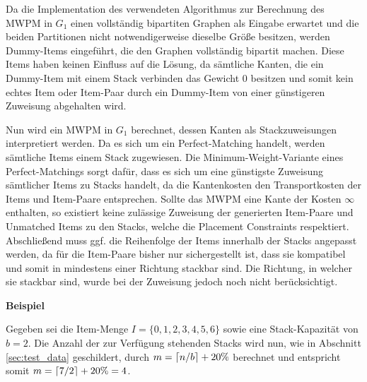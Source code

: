 Da die Implementation des verwendeten Algorithmus zur Berechnung des \textsc{MWPM} in $G_1$ einen vollständig bipartiten Graphen als Eingabe
erwartet und die beiden Partitionen nicht notwendigerweise dieselbe Größe besitzen, werden Dummy-Items eingeführt, die den Graphen
vollständig bipartit machen. Diese Items haben keinen Einfluss auf die Lösung, da sämtliche Kanten, die ein Dummy-Item mit einem Stack
verbinden das Gewicht $0$ besitzen und somit kein echtes Item oder Item-Paar durch ein Dummy-Item von einer günstigeren Zuweisung
abgehalten wird.

Nun wird ein \textsc{MWPM} in $G_1$ berechnet, dessen Kanten als Stackzuweisungen interpretiert werden.
Da es sich um ein Perfect-Matching handelt, werden sämtliche Items einem Stack zugewiesen. Die Minimum-Weight-Variante eines
Perfect-Matchings sorgt dafür, dass es sich um eine günstigste Zuweisung sämtlicher Items zu Stacks handelt, da die Kantenkosten
den Transportkosten der Items und Item-Paare entsprechen. Sollte das \textsc{MWPM} eine Kante der Kosten $\infty$ enthalten, so existiert
keine zulässige Zuweisung der generierten Item-Paare und Unmatched Items zu den Stacks, welche die Placement Constraints respektiert.
Abschließend muss ggf. die Reihenfolge der Items innerhalb der Stacks angepasst werden, da für die Item-Paare bisher nur sichergestellt ist,
dass sie kompatibel und somit in mindestens einer Richtung stackbar sind. Die Richtung, in welcher sie stackbar sind, wurde bei der Zuweisung
jedoch noch nicht berücksichtigt.

\pagebreak

\textbf{Beispiel}

Gegeben sei die Item-Menge $I = \{0, 1, 2, 3, 4, 5, 6\}$ sowie eine Stack-Kapazität von $b = 2$.
Die Anzahl der zur Verfügung stehenden Stacks wird nun, wie in Abschnitt \ref{sec:test_data} geschildert,
durch $m = \lceil n / b\rceil + 20 \%$ berechnet und entspricht somit $m = \lceil7 / 2\rceil + 20 \% = 4$.

